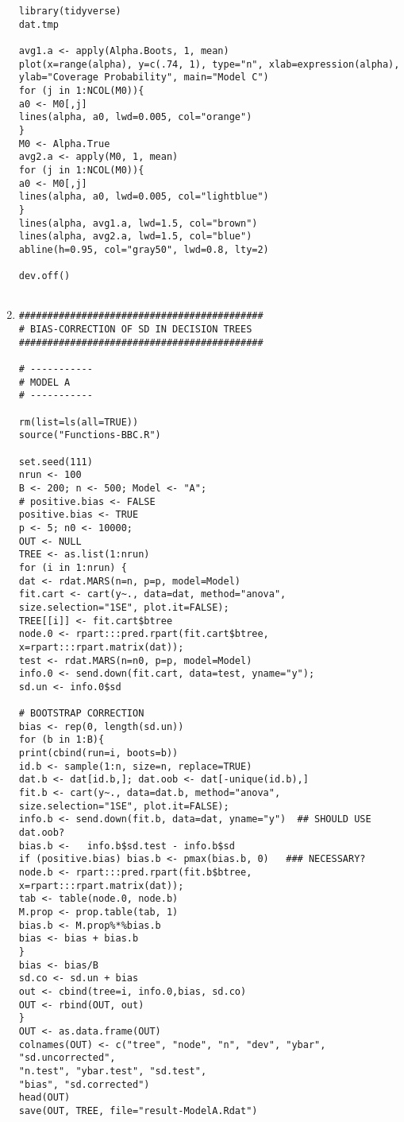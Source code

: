 \begin{enumerate}[A]
\begin{verbatim}
library(tidyverse)
dat.tmp 

avg1.a <- apply(Alpha.Boots, 1, mean)
plot(x=range(alpha), y=c(.74, 1), type="n", xlab=expression(alpha),
ylab="Coverage Probability", main="Model C")
for (j in 1:NCOL(M0)){
a0 <- M0[,j]
lines(alpha, a0, lwd=0.005, col="orange") 
}
M0 <- Alpha.True
avg2.a <- apply(M0, 1, mean)
for (j in 1:NCOL(M0)){
a0 <- M0[,j]
lines(alpha, a0, lwd=0.005, col="lightblue") 
}
lines(alpha, avg1.a, lwd=1.5, col="brown")
lines(alpha, avg2.a, lwd=1.5, col="blue")
abline(h=0.95, col="gray50", lwd=0.8, lty=2)

dev.off()


\end{verbatim}


\item \begin{verbatim}
###########################################
# BIAS-CORRECTION OF SD IN DECISION TREES  
###########################################

# -----------
# MODEL A
# -----------

rm(list=ls(all=TRUE))
source("Functions-BBC.R")

set.seed(111)
nrun <- 100
B <- 200; n <- 500; Model <- "A"; 
# positive.bias <- FALSE
positive.bias <- TRUE
p <- 5; n0 <- 10000;
OUT <- NULL
TREE <- as.list(1:nrun)
for (i in 1:nrun) {
dat <- rdat.MARS(n=n, p=p, model=Model)
fit.cart <- cart(y~., data=dat, method="anova", size.selection="1SE", plot.it=FALSE);
TREE[[i]] <- fit.cart$btree
node.0 <- rpart:::pred.rpart(fit.cart$btree, x=rpart:::rpart.matrix(dat));
test <- rdat.MARS(n=n0, p=p, model=Model)
info.0 <- send.down(fit.cart, data=test, yname="y"); 
sd.un <- info.0$sd

# BOOTSTRAP CORRECTION
bias <- rep(0, length(sd.un))
for (b in 1:B){
print(cbind(run=i, boots=b))
id.b <- sample(1:n, size=n, replace=TRUE) 
dat.b <- dat[id.b,]; dat.oob <- dat[-unique(id.b),]
fit.b <- cart(y~., data=dat.b, method="anova", size.selection="1SE", plot.it=FALSE);
info.b <- send.down(fit.b, data=dat, yname="y")  ## SHOULD USE dat.oob?
bias.b <-  	info.b$sd.test - info.b$sd
if (positive.bias) bias.b <- pmax(bias.b, 0)   ### NECESSARY?
node.b <- rpart:::pred.rpart(fit.b$btree, x=rpart:::rpart.matrix(dat)); 
tab <- table(node.0, node.b) 
M.prop <- prop.table(tab, 1)
bias.b <- M.prop%*%bias.b
bias <- bias + bias.b
}
bias <- bias/B
sd.co <- sd.un + bias
out <- cbind(tree=i, info.0,bias, sd.co)
OUT <- rbind(OUT, out)
}
OUT <- as.data.frame(OUT)
colnames(OUT) <- c("tree", "node", "n", "dev", "ybar", "sd.uncorrected", 
"n.test", "ybar.test", "sd.test",
"bias", "sd.corrected")
head(OUT)
save(OUT, TREE, file="result-ModelA.Rdat") 




\end{verbatim}
\end{enumerate}
